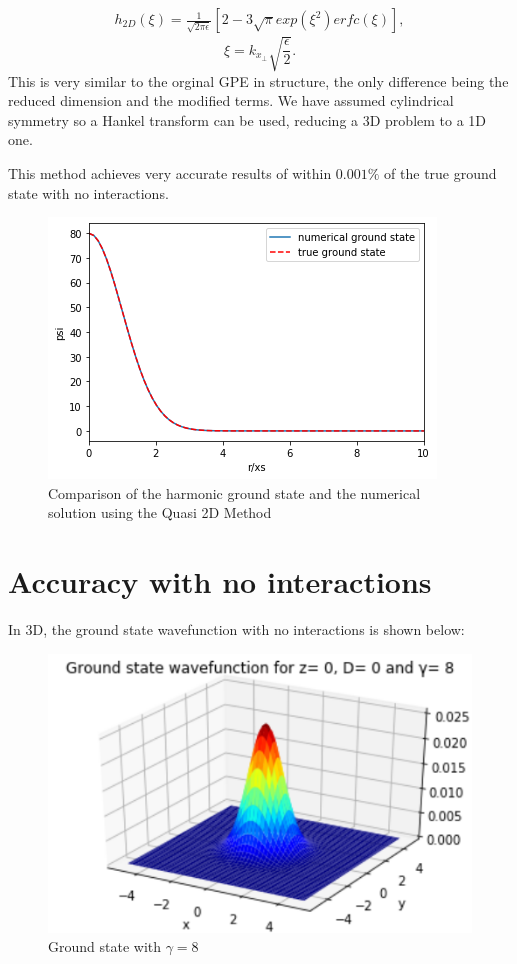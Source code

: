 \documentclass[10pt]{article}
\numberwithin{equation}{section}
\begin{document}
\begin{multicols}{2}
\begin{multline}
h_{2D}(\xi)=\frac{1}{\sqrt{2\pi\epsilon}}[2-3\sqrt{\pi}exp(\xi^2)erfc(\xi)],              
\end{multline}
\begin{equation}
\xi = k_{x_{\perp}}\sqrt{\frac{\epsilon}{2}}.             
\end{equation}
This is very similar to the orginal GPE in structure, the only difference being the reduced dimension and the modified terms. We have assumed cylindrical symmetry so a Hankel transform can be used, reducing a 3D problem to a 1D one. 

This method achieves very accurate results of within $0.001\%$ of the true ground state with no interactions.
\begin{figure}[H]
\centering
\includegraphics[width=0.8\linewidth]{gndstateQuasi2DHankel}
\caption{Comparison of the harmonic ground state and the numerical solution using the Quasi 2D Method}
\end{figure}


\section{Accuracy with no interactions}
In 3D, the ground state wavefunction with no interactions is shown below:

\begin{figure}[H]
\centering
\includegraphics[width=0.8\linewidth]{gndstate1}
\caption{Ground state with $\gamma=8$}
\end{figure}


\end{multicols}
\end{document}
